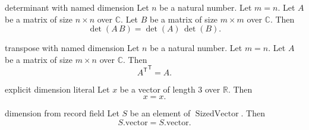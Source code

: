 \begin{cleanresult}{determinant with named dimension}
Let $n$ be a natural number.
Let $m = n$.
Let $A$ be a matrix of size $n\times n$ over $\mathbb{C}$.
Let $B$ be a matrix of size $m\times m$ over $\mathbb{C}$.
Then \[\det(A \, B) = \det(A) \, \det(B).\]
\end{cleanresult}

\begin{cleanresult}{transpose with named dimension}
Let $n$ be a natural number.
Let $m = n$.
Let $A$ be a matrix of size $m\times n$ over $\mathbb{C}$.
Then \[{{A}^{\mathsf T}}^{\mathsf T} = A.\]
\end{cleanresult}

\begin{cleanresult}{explicit dimension literal}
Let $x$ be a vector of length $3$ over $\mathbb{R}$.
Then \[x = x.\]
\end{cleanresult}

\begin{cleanresult}{dimension from record field}
Let $S$ be an element of $\operatorname{SizedVector}$.
Then \[S.\mathrm{vector} = S.\mathrm{vector}.\]
\end{cleanresult}

